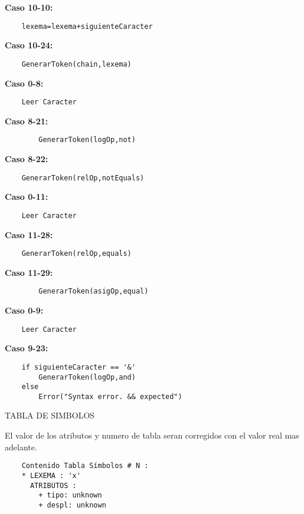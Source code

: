 \documentclass{article}
\begin{document}
\textbf{Caso 10-10:}
\begin{verbatim}
    lexema=lexema+siguienteCaracter
\end{verbatim}

\textbf{Caso 10-24:}
\begin{verbatim}
    GenerarToken(chain,lexema)
\end{verbatim}

\textbf{Caso 0-8:}
\begin{verbatim}
    Leer Caracter
\end{verbatim}

\textbf{Caso 8-21:}
\begin{verbatim}
        GenerarToken(logOp,not)
\end{verbatim}

\textbf{Caso 8-22:}
\begin{verbatim}
    GenerarToken(relOp,notEquals) 
\end{verbatim}

\textbf{Caso 0-11:}
\begin{verbatim}
    Leer Caracter
\end{verbatim}

\textbf{Caso 11-28:}
\begin{verbatim}
    GenerarToken(relOp,equals) 
\end{verbatim}

\textbf{Caso 11-29:}
\begin{verbatim}
        GenerarToken(asigOp,equal)
\end{verbatim}
\newpage
\textbf{Caso 0-9:}
\begin{verbatim}
    Leer Caracter
\end{verbatim}

\textbf{Caso 9-23:}
\begin{verbatim}
    if siguienteCaracter == '&'
        GenerarToken(logOp,and)
    else
        Error("Syntax error. && expected")
\end{verbatim}

\vspace*{1cm}

\begin{center}
    TABLA DE SIMBOLOS\\
    \end{center}
\vspace*{1cm}
El valor de los atributos y numero de tabla seran corregidos con el valor real mas adelante.
\begin{verbatim}
    Contenido Tabla Símbolos # N :
    * LEXEMA : 'x'
      ATRIBUTOS :
        + tipo: unknown
        + despl: unknown
    
\end{verbatim}
\newpage
\end{document}
